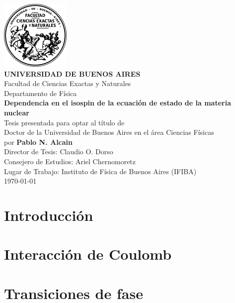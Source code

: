 \documentclass[12pt]{book}
\begin{document}
\frontmatter
\thispagestyle{empty}
\begin{center}
\large{
\includegraphics[width=0.25\textwidth]{logo.png}\vspace{1cm}\\
\textbf{UNIVERSIDAD DE BUENOS AIRES}\\
Facultad de Ciencias Exactas y Naturales\\
Departamento de Física\vspace{1.5cm}\\
\textbf{\LARGE Dependencia en el isospin de la ecuación de estado de la materia nuclear}
\vspace{0.5cm}\\
Tesis presentada para optar al título de \\
Doctor de la Universidad de Buenos Aires en el área Ciencias Físicas\\
por \textbf{Pablo N. Alcain} \vspace{1.5cm}\\
Director de Tesis: Claudio O. Dorso\\
Consejero de Estudios: Ariel Chernomoretz\\
Lugar de Trabajo: Instituto de Física de Buenos Aires (IFIBA)
\vspace{1.5cm}\\
\today
}
\end{center}


\tableofcontents
\mainmatter
\chapter[Introducción]{Introducción}
\label{ch:introduccion}



\chapter[Efecto de Coulomb]{Interacción de Coulomb}
\label{ch:coulomb}


\chapter[Transiciones de fase]{Transiciones de fase}
\label{ch:transicion}

\end{document}
